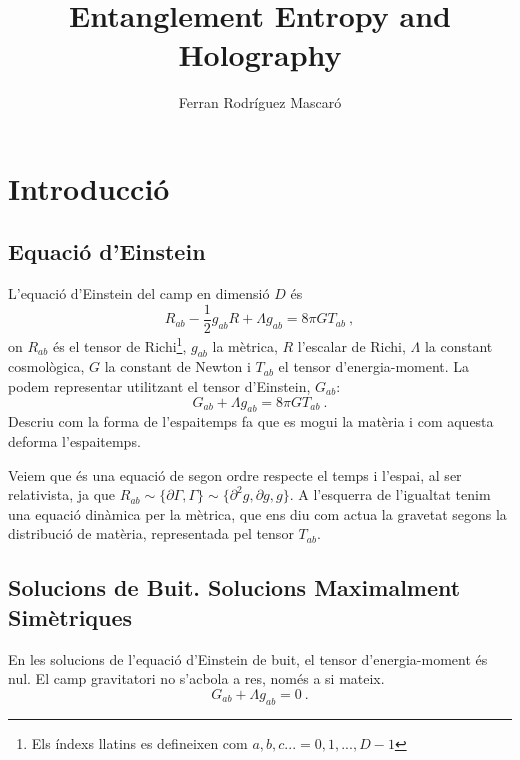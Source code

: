 \documentclass[twocolumn]{article}
\title{Entanglement Entropy and Holography}
\author{Ferran Rodríguez Mascaró}
\date{}
\begin{document}
\maketitle{}


    


\section{Introducció}

\subsection{Equació d'Einstein}

L'equació d'Einstein del camp en dimensió $D$ és
\begin{equation}
    R_{ab} - \frac{1}{2} g_{ab} R + \Lambda g_{ab} = 8 \pi G T_{ab} \ ,
\label{eq:Einstein}
\end{equation}
on $R_{ab}$ és el tensor de Richi\footnote{Els índexs llatins es defineixen com $a,b,c...={0,1,...,D-1}$}, $g_{ab}$ la mètrica\footnotemark, $R$ l'escalar de Richi, $\Lambda$ la constant cosmològica, $G$ la constant de Newton i $T_{ab}$ el tensor d'energia-moment. La podem representar utilitzant el tensor d'Einstein, $G_{ab}$:
\begin{equation}
    G_{ab} + \Lambda g_{ab} = 8 \pi G T_{ab} \ .
\label{eq:Einstein2}
\end{equation}
Descriu com la forma de l'espaitemps fa que es mogui la matèria i com aquesta deforma l'espaitemps.

Veiem que és una equació de segon ordre respecte el temps i l'espai, al ser relativista, ja que $R_{ab} \sim \{ \partial \Gamma , \Gamma \} \sim \{ \partial^2 g, \partial g, g \}$. A l'esquerra de l'igualtat tenim una equació dinàmica per la mètrica, que ens diu com actua la gravetat segons la distribució de matèria, representada pel tensor $T_{ab}$.

\subsection{Solucions de Buit. Solucions Maximalment Simètriques}

En les solucions de l'equació d'Einstein de buit, el tensor d'energia-moment és nul. El camp gravitatori no s'acbola a res, només a si mateix.
\begin{equation}
    G_{ab} + \Lambda g_{ab} = 0 \ .
\label{eq:SolBuit}
\end{equation}
\end{document}
